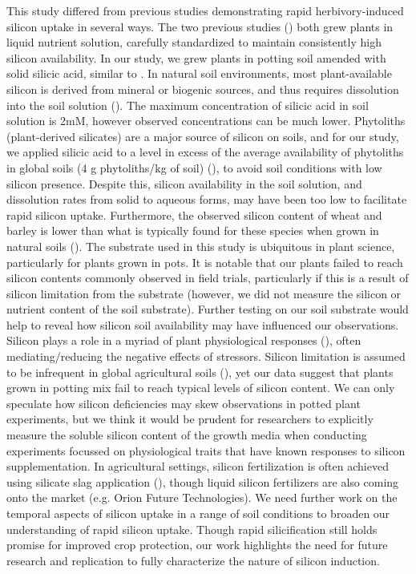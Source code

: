 \documentclass[12pt, letterpaper]{report}
\begin{document}
This study differed from previous studies demonstrating rapid herbivory-induced silicon uptake in several ways. The two previous studies (\cite{waterman_short-term_2021,waterman_short-term_2021-1}) both grew plants in liquid nutrient solution, carefully standardized to maintain consistently high silicon availability. In our study, we grew plants in potting soil amended with solid silicic acid, similar to \textcite{nascimento_silicon_2019}. In natural soil environments, most plant-available silicon is derived from mineral or biogenic sources, and thus requires dissolution into the soil solution (\cite{de_tombeur_silicon_2021-1}). The maximum concentration of silicic acid in soil solution is 2mM, however observed concentrations can be much lower. Phytoliths (plant-derived silicates) are a major source of silicon on soils, and for our study, we applied silicic acid to a level in excess of the average availability of phytoliths in global soils (4 g phytoliths/kg of soil) (\cite{de_tombeur_plants_2020}), to avoid soil conditions with low silicon presence. Despite this, silicon availability in the soil solution, and dissolution rates from solid to aqueous forms, may have been too low to facilitate rapid silicon uptake. Furthermore, the observed silicon content of wheat and barley is lower than what is typically found for these species when grown in natural soils (\cite{parr_phytolith_2011,simpson_still_2017}). The substrate used in this study is ubiquitous in plant science, particularly for plants grown in pots. It is notable that our plants failed to reach silicon contents commonly observed in field trials, particularly if this is a result of silicon limitation from the substrate (however, we did not measure the silicon or nutrient content of the soil substrate). Further testing on our soil substrate would help to reveal how silicon soil availability may have influenced our observations. Silicon plays a role in a myriad of plant physiological responses (\cite{coskun_controversies_2019}), often mediating/reducing the negative effects of stressors. Silicon limitation is assumed to be infrequent in global agricultural soils (\cite{guntzer_benefits_2012,haynes_contemporary_2014}), yet our data suggest that plants grown in potting mix fail to reach typical levels of silicon content. We can only speculate how silicon deficiencies may skew observations in potted plant experiments, but we think it would be prudent for researchers to explicitly measure the soluble silicon content of the growth media when conducting experiments focussed on physiological traits that have known responses to silicon supplementation. In agricultural settings, silicon fertilization is often achieved using silicate slag application (\cite{meena_case_2014}), though liquid silicon fertilizers are also coming onto the market (e.g. Orion Future Technologies). We need further work on the temporal aspects of silicon uptake in a range of soil conditions to broaden our understanding of rapid silicon uptake. Though rapid silicification still holds promise for improved crop protection, our work highlights the need for future research and replication to fully characterize the nature of silicon induction. 
\end{document}
